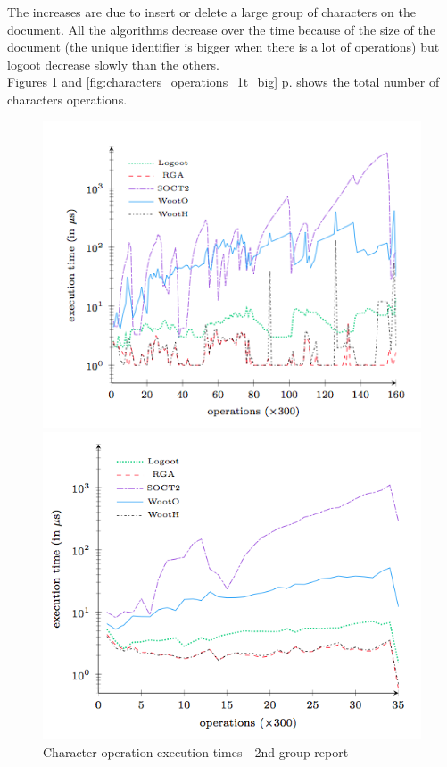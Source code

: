 The increases are due to insert or delete a large group of characters on the document. All the algorithms decrease over the time because of the size of the document (the unique identifier is bigger when there is a lot of operations) but logoot decrease slowly than the others.\\

Figures \ref{fig:characters_operations_2g_report} and \ref{fig:characters_operations_1t_big} p.\pageref{fig:characters_operations_2g_report} shows the total number of characters operations.

\begin{figure}[h]
\begin{minipage}{0.50\linewidth}
\includegraphics[width=1.2\textwidth]{includes/characters_operations_2g_report.png}
  \caption{Character operation execution times - 2nd
group report}
  \label{fig:characters_operations_2g_report}
  \end{minipage} \hfill
  \begin{minipage}{.50\linewidth}
\includegraphics[width=1.2\textwidth]{includes/characters_operations_1t_big.png}

\end{minipage}
\end{figure}
